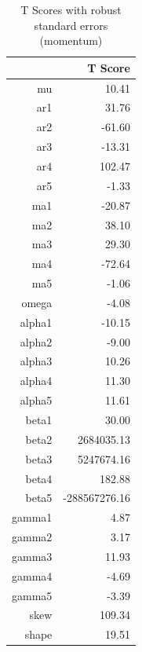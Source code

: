 \documentclass[11pt,letterpaper]{memoir}
\begin{document}
\begin{table}[ht]
\centering
\caption{T Scores with robust standard errors (momentum)}
\begin{tabular}{rr}
  \hline
 & T Score \\ 
  \hline
mu & 10.41 \\ 
  ar1 & 31.76 \\ 
  ar2 & -61.60 \\ 
  ar3 & -13.31 \\ 
  ar4 & 102.47 \\ 
  ar5 & -1.33 \\ 
  ma1 & -20.87 \\ 
  ma2 & 38.10 \\ 
  ma3 & 29.30 \\ 
  ma4 & -72.64 \\ 
  ma5 & -1.06 \\ 
  omega & -4.08 \\ 
  alpha1 & -10.15 \\ 
  alpha2 & -9.00 \\ 
  alpha3 & 10.26 \\ 
  alpha4 & 11.30 \\ 
  alpha5 & 11.61 \\ 
  beta1 & 30.00 \\ 
  beta2 & 2684035.13 \\ 
  beta3 & 5247674.16 \\ 
  beta4 & 182.88 \\ 
  beta5 & -288567276.16 \\ 
  gamma1 & 4.87 \\ 
  gamma2 & 3.17 \\ 
  gamma3 & 11.93 \\ 
  gamma4 & -4.69 \\ 
  gamma5 & -3.39 \\ 
  skew & 109.34 \\ 
  shape & 19.51 \\ 
   \hline
\end{tabular}
\end{table}
\end{document}
